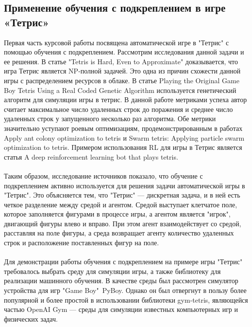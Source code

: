 \documentclass{article}
\begin{document}
\begin{center}
\item\subsection{Применение обучения с подкреплением в игре «Тетрис»}
\end{center}
Первая часть курсовой работы посвящена автоматической игре в "Тетрис" с помощью обучения с подкреплением. Рассмотрим исследования данной задачи и ее решения. В статье "Tetris is Hard, Even to Approximate"\cite{litlink6} доказывается, что игра Тетрис является NP-полной задачей. Это одна из причин схожести данной игры с распределением ресурсов в облаке\cite{litlink6}. В статье Playing the Original Game Boy Tetris Using a Real Coded Genetic Algorithm\cite{litlink7} используется генетический алгоритм для симуляции игры в тетрис. В данной работе метриками успеха автор считает максимальное число удаленных строк до поражения и среднее число удаленных строк у запущенного несколько раз алгоритма. Обе метрики значительно уступают роевым оптимизациям,  продемонстрированным в работах Apply ant colony optimization to tetris\cite{litlink19} и Swarm tetris: Applying particle swarm optimization to tetris\cite{litlink10}. Примером использования RL для игры в Тетрис является статья A deep reinforcement learning bot that plays tetris\cite{litlink13}.\\~\\
Таким образом, исследование источников показало, что обучение с подкреплением активно используется для решения задачи автоматической игры в "Тетрис". Это объясняется тем, что "Тетрис" — дискретная задача, и в ней есть четкое разделение между средой и агентом. Средой выступает клетчатое поле, которое заполняется фигурами в процессе игры, а агентом является "игрок", двигающий фигуры влево и вправо. При этом агент взаимодействует со средой, расставляя на поле фигуры, а среда возвращает агенту количество удаленных строк и расположение поставленных фигур на поле.\\~\\
Для демонстрации работы обучения с подкреплением на примере игры "Тетрис" требовалось выбрать среду для симуляции игры, а также библиотеку для реализации машинного обучения. 
В качестве среды был рассмотрен симулятор устройства для игр "Game Boy"\ PyBoy\cite{litlink3}. Однако он был отвергнут в пользу более популярной и более простой в использовании библиотеки gym-tetris\cite{litlink5}, являющейся частью OpenAI Gym\cite{litlink14} — среды для симуляции известных компьютерных игр и физических задач.\\
\end{document}
